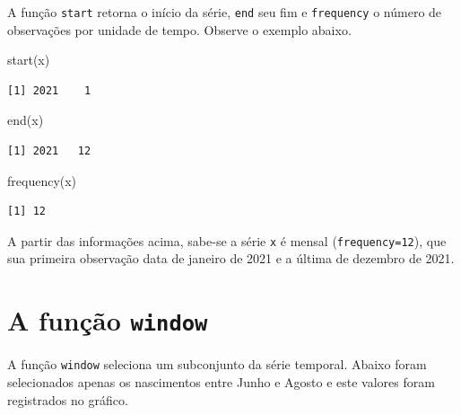 \documentclass[
  letterpaper,
  DIV=11,
  numbers=noendperiod]{scrreprt}
\newenvironment{Shaded}{\begin{snugshade}}{\end{snugshade}}
\newcommand{\FunctionTok}[1]{\textcolor[rgb]{0.28,0.35,0.67}{#1}}
\newcommand{\NormalTok}[1]{\textcolor[rgb]{0.00,0.23,0.31}{#1}}
\theoremstyle{plain}
\theoremstyle{definition}
\theoremstyle{definition}
\theoremstyle{remark}
\begin{document}
A função \texttt{start} retorna o início da série, \texttt{end} seu fim
e \texttt{frequency} o número de observações por unidade de tempo.
Observe o exemplo abaixo.

\begin{Shaded}
\begin{Highlighting}[]
\FunctionTok{start}\NormalTok{(x)}
\end{Highlighting}
\end{Shaded}

\begin{verbatim}
[1] 2021    1
\end{verbatim}

\begin{Shaded}
\begin{Highlighting}[]
\FunctionTok{end}\NormalTok{(x)}
\end{Highlighting}
\end{Shaded}

\begin{verbatim}
[1] 2021   12
\end{verbatim}

\begin{Shaded}
\begin{Highlighting}[]
\FunctionTok{frequency}\NormalTok{(x)}
\end{Highlighting}
\end{Shaded}

\begin{verbatim}
[1] 12
\end{verbatim}

A partir das informações acima, sabe-se a série \texttt{x} é mensal
(\texttt{frequency=12}), que sua primeira observação data de janeiro de
2021 e a última de dezembro de 2021.

\hypertarget{a-funuxe7uxe3o-window}{%
\section{\texorpdfstring{A função
\texttt{window}}{A função window}}\label{a-funuxe7uxe3o-window}}

A função \texttt{window} seleciona um subconjunto da série temporal.
Abaixo foram selecionados apenas os nascimentos entre Junho e Agosto e
este valores foram registrados no gráfico.
\end{document}
